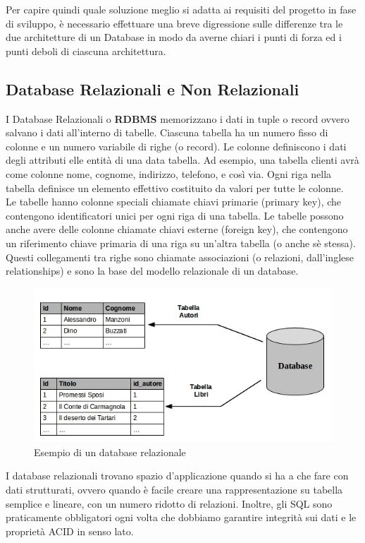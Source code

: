 Per capire quindi quale soluzione meglio si adatta ai requisiti del progetto in fase di sviluppo, è necessario effettuare una breve digressione sulle differenze tra le due architetture di un Database in modo da averne chiari i punti di forza ed i punti deboli di ciascuna architettura.\\

\subsection{Database Relazionali e Non Relazionali}
I Database Relazionali o \textbf{RDBMS} memorizzano i dati in tuple o record ovvero salvano i dati all'interno di tabelle. Ciascuna tabella ha un numero fisso di colonne e un numero variabile di righe (o record). Le colonne definiscono i dati degli attributi elle entità di una data tabella. Ad esempio, una tabella clienti avrà come colonne nome, cognome, indirizzo, telefono, e così via. Ogni riga nella tabella definisce un elemento effettivo costituito da valori per tutte le colonne.\\
Le tabelle hanno colonne speciali chiamate chiavi primarie (primary key), che contengono identificatori unici per ogni riga di una tabella. Le tabelle possono anche avere delle colonne chiamate chiavi esterne (foreign key), che contengono un riferimento chiave primaria di una riga su un’altra tabella (o anche sè stessa). Questi collegamenti tra righe sono chiamate associazioni (o relazioni, dall’inglese relationships) e sono la base del modello relazionale di un database.\\
\begin{figure}
	\begin{center}
		\includegraphics[width=0.5\columnwidth]{images/relational_db}
	\end{center}
	\caption{Esempio di un database relazionale}
	\label{fig:relational_db}
\end{figure}
I database relazionali trovano spazio d’applicazione quando si ha a che fare con dati strutturati, ovvero quando è facile creare una rappresentazione su tabella semplice e lineare, con un numero ridotto di relazioni. Inoltre, gli SQL sono praticamente obbligatori ogni volta che dobbiamo garantire integrità sui dati e le proprietà ACID in senso lato.\\
